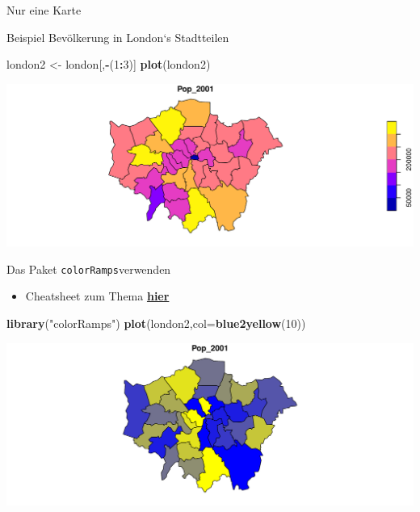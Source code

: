 \documentclass[ignorenonframetext,]{beamer}
\newenvironment{Shaded}{\begin{snugshade}}{\end{snugshade}}
\newcommand{\DataTypeTok}[1]{\textcolor[rgb]{0.13,0.29,0.53}{#1}}
\newcommand{\DecValTok}[1]{\textcolor[rgb]{0.00,0.00,0.81}{#1}}
\newcommand{\KeywordTok}[1]{\textcolor[rgb]{0.13,0.29,0.53}{\textbf{#1}}}
\newcommand{\NormalTok}[1]{#1}
\newcommand{\OperatorTok}[1]{\textcolor[rgb]{0.81,0.36,0.00}{\textbf{#1}}}
\newcommand{\StringTok}[1]{\textcolor[rgb]{0.31,0.60,0.02}{#1}}
\providecommand{\tightlist}{%
  \setlength{\itemsep}{0pt}\setlength{\parskip}{0pt}}
\begin{document}
\begin{frame}[fragile]{Nur eine Karte}
\protect\hypertarget{nur-eine-karte}{}

\begin{block}{Beispiel Bevölkerung in London`s Stadtteilen}

\begin{Shaded}
\begin{Highlighting}[]
\NormalTok{london2 <-}\StringTok{ }\NormalTok{london[,}\OperatorTok{-}\NormalTok{(}\DecValTok{1}\OperatorTok{:}\DecValTok{3}\NormalTok{)]}
\KeywordTok{plot}\NormalTok{(london2)}
\end{Highlighting}
\end{Shaded}

\includegraphics{B7_simplefeatures_files/figure-beamer/unnamed-chunk-11-1.pdf}

\end{block}

\end{frame}

\begin{frame}[fragile]{Das Paket \texttt{colorRamps}verwenden}
\protect\hypertarget{das-paket-colorrampsverwenden}{}

\begin{itemize}
\tightlist
\item
  Cheatsheet zum Thema
  \href{https://www.nceas.ucsb.edu/~frazier/RSpatialGuides/colorPaletteCheatsheet.pdf}{\textbf{hier}}
\end{itemize}

\begin{Shaded}
\begin{Highlighting}[]
\KeywordTok{library}\NormalTok{(}\StringTok{"colorRamps"}\NormalTok{)}
\KeywordTok{plot}\NormalTok{(london2,}\DataTypeTok{col=}\KeywordTok{blue2yellow}\NormalTok{(}\DecValTok{10}\NormalTok{))}
\end{Highlighting}
\end{Shaded}

\includegraphics{B7_simplefeatures_files/figure-beamer/unnamed-chunk-12-1.pdf}

\end{frame}
\end{document}
